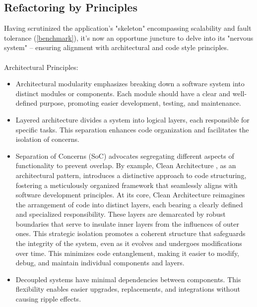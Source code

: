 
\subsection{Refactoring by Principles} \label{refactoring}

Having scrutinized the application's "skeleton" encompassing scalability and fault tolerance (\ref{benchmark}), it's 
now an opportune juncture to delve into its "nervous system" -- ensuring alignment with architectural and code style 
principles.\\
\\

\noindent Architectural Principles:

\begin{itemize}
  \item Architectural modularity \cite{Rich20} emphasizes breaking down a software system into distinct modules or 
  components. Each module should have a clear and well-defined purpose, promoting easier development, testing, and 
  maintenance.

  \item Layered architecture \cite{Rich22} divides a system into logical layers, each responsible for specific tasks. 
  This separation enhances code organization and facilitates the isolation of concerns.

  \item Separation of Concerns (SoC) advocates segregating different aspects of functionality to prevent overlap. By 
  example, Clean Architecture \cite{Mart18}, as an architectural pattern, introduces a distinctive approach to code 
  structuring, fostering a meticulously organized framework that seamlessly aligns with software development principles. 
  At its core, Clean Architecture reimagines the arrangement of code into distinct layers, each bearing a clearly 
  defined and specialized responsibility. These layers are demarcated by robust boundaries that serve to insulate 
  inner layers from the influences of outer ones. This strategic isolation promotes a coherent structure that safeguards 
  the integrity of the system, even as it evolves and undergoes modifications over time. This minimizes code 
  entanglement, making it easier to modify, debug, and maintain individual components and layers.

  \item Decoupled systems \cite{Kass05} have minimal dependencies between components. This flexibility enables easier 
  upgrades, replacements, and integrations without causing ripple effects.
\end{itemize}

